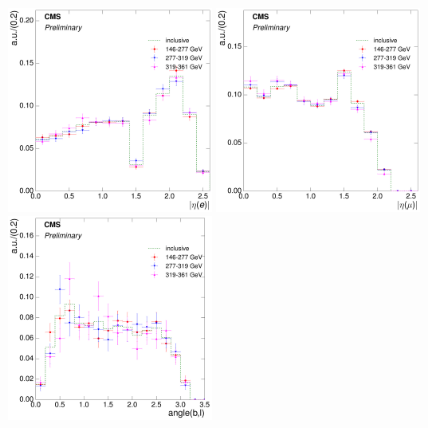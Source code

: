 \begin{figure}[hbtp]
    \centering
     \includegraphics[width=0.48\textwidth]{Chapters/04_Analysis/04b_XSections/images/8TeV/fit_variables/electron/ST/electron_absolute_eta/qcd/ST_electron_absolute_eta_0orMoreBtag_QCD_template_comparison.pdf}\hfill
     \includegraphics[width=0.48\textwidth]{Chapters/04_Analysis/04b_XSections/images/8TeV/fit_variables/muon/ST/muon_absolute_eta/qcd/ST_muon_absolute_eta_0orMoreBtag_QCD_template_comparison.pdf}\\
     \includegraphics[width=0.48\textwidth]{Chapters/04_Analysis/04b_XSections/images/8TeV/fit_variables/electron/ST/angle_bl/qcd/ST_angle_bl_1orMoreBtag_QCD_template_comparison.pdf}\hfill

\end{figure}
